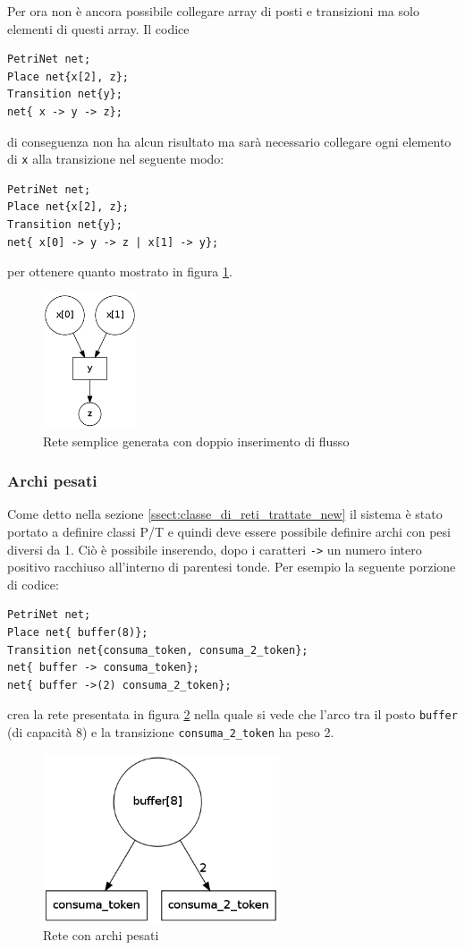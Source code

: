 \documentclass[italian,12pt]{book}
\begin{document}
Per ora non è ancora possibile collegare array di posti e transizioni ma solo elementi di questi array.
Il codice 
\begin{verbatim}PetriNet net;
Place net{x[2], z};
Transition net{y};
net{ x -> y -> z};
\end{verbatim}
di conseguenza non ha alcun risultato ma sarà necessario collegare ogni elemento di {\tt x} alla transizione
nel seguente modo:
\begin{verbatim}PetriNet net;
Place net{x[2], z};
Transition net{y};
net{ x[0] -> y -> z | x[1] -> y};
\end{verbatim}
per ottenere quanto mostrato in figura \ref{fig:flussi2.png}.

\begin{figure}[htb]
\centerline{\includegraphics[height=4cm]{img/flussi2.png}}
\caption{Rete semplice generata con doppio inserimento di flusso}\label{fig:flussi2.png}
\end{figure}

\subsubsection{Archi pesati}
Come detto nella sezione \ref{ssect:classe_di_reti_trattate_new} il sistema è stato portato a definire 
classi P/T e quindi deve essere possibile definire archi con pesi diversi da 1. Ciò è possibile inserendo, dopo
i caratteri {\tt ->} un numero intero positivo racchiuso all'interno di parentesi tonde. Per esempio la seguente
porzione di codice:
\begin{verbatim}PetriNet net;
Place net{ buffer(8)};
Transition net{consuma_token, consuma_2_token};
net{ buffer -> consuma_token};
net{ buffer ->(2) consuma_2_token};
\end{verbatim}
crea la rete presentata in figura \ref{fig:flussi3.png} nella quale si vede che l'arco tra il posto {\tt buffer}
(di capacità 8) e la transizione {\tt consuma\_2\_token} ha peso 2.

\begin{figure}[htb]
\centerline{\includegraphics[height=5cm]{img/flussi3.png}}
\caption{Rete con archi pesati}\label{fig:flussi3.png}
\end{figure}
\end{document}
